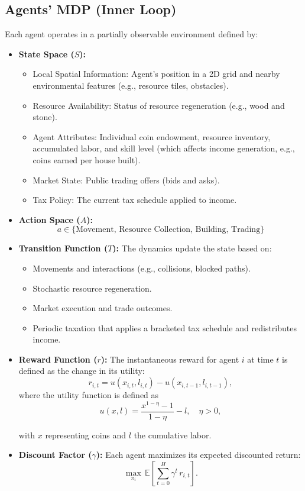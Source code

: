 \subsection{Agents' MDP (Inner Loop)}
Each agent operates in a partially observable environment defined by:
\begin{itemize}
    \item \textbf{State Space ($S$):} 
    \begin{itemize}
        \item Local Spatial Information: Agent's position in a 2D grid and nearby environmental features (e.g., resource tiles, obstacles).
        \item Resource Availability: Status of resource regeneration (e.g., wood and stone).
        \item Agent Attributes: Individual coin endowment, resource inventory, accumulated labor, and skill level (which affects income generation, e.g., coins earned per house built).
        \item Market State: Public trading offers (bids and asks).
        \item Tax Policy: The current tax schedule applied to income.
    \end{itemize}
    
    \item \textbf{Action Space ($A$):}
    \[
    a \in \{\text{Movement, Resource Collection, Building, Trading}\}
    \]
    
    \item \textbf{Transition Function ($T$):} The dynamics update the state based on:
    \begin{itemize}
        \item Movements and interactions (e.g., collisions, blocked paths).
        \item Stochastic resource regeneration.
        \item Market execution and trade outcomes.
        \item Periodic taxation that applies a bracketed tax schedule and redistributes income.
    \end{itemize}
    
    \item \textbf{Reward Function ($r$):} The instantaneous reward for agent $i$ at time $t$ is defined as the change in its utility:
    \[
    r_{i,t} = u(x_{i,t}, l_{i,t}) - u(x_{i,t-1}, l_{i,t-1}),
    \]
    where the utility function is defined as
    \[
    u(x, l) = \frac{x^{1-\eta} - 1}{1-\eta} - l, \quad \eta > 0,
    \]

    with \(x\) representing coins and \(l\) the cumulative labor.
    
    \item \textbf{Discount Factor ($\gamma$):} Each agent maximizes its expected discounted return:
    \[
    \max_{\pi_i} \, \mathbb{E}\left[\sum_{t=0}^{H} \gamma^t\, r_{i,t}\right].
    \]
\end{itemize}


